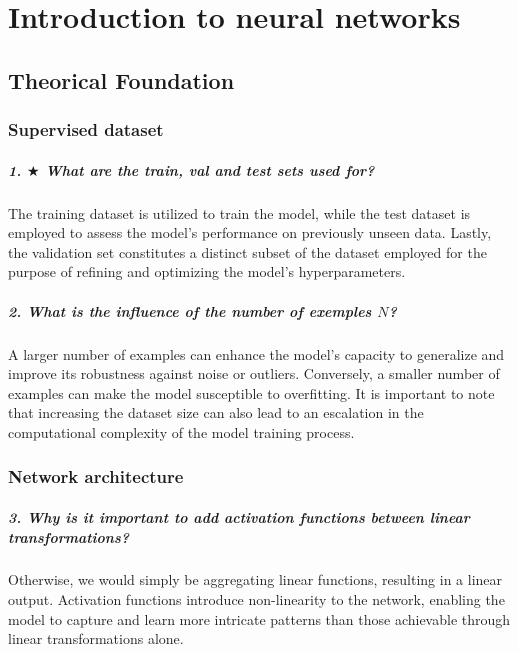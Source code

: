 \chapter{Introduction to neural networks}
\section{Theorical Foundation}
\subsection{Supervised dataset}
\paragraph{1. $\bigstar$ What are the train, val and test sets used for?}
The training dataset is utilized to train the model, while the test dataset is employed to assess the model's performance on previously unseen data. Lastly, the validation set constitutes a distinct subset of the dataset employed for the purpose of refining and optimizing the model's hyperparameters.

\paragraph{2. What is the influence of the number of exemples $N$?}
A larger number of examples can enhance the model's capacity to generalize and improve its robustness against noise or outliers. Conversely, a smaller number of examples can make the model susceptible to overfitting. It is important to note that increasing the dataset size can also lead to an escalation in the computational complexity of the model training process.

\subsection{Network architecture}
\paragraph{3. Why is it important to add activation functions between linear transformations?}
Otherwise, we would simply be aggregating linear functions, resulting in a linear output. Activation functions introduce non-linearity to the network, enabling the model to capture and learn more intricate patterns than those achievable through linear transformations alone.


